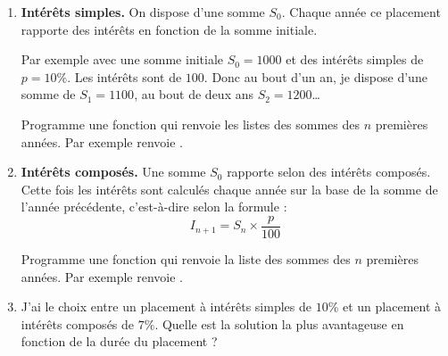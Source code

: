 \documentclass[11pt,class=report,crop=false]{standalone}
\begin{document}
\begin{activite}


\begin{enumerate}
  \item \textbf{Intérêts simples.} On dispose d'une somme $S_0$. Chaque année ce placement rapporte des intérêts en fonction de la somme initiale. 
 
  Par exemple avec une somme initiale $S_0 = 1000$ et des intérêts simples de $p = 10 \%$. Les intérêts sont de $100$. Donc au bout d'un an, je dispose d'une somme de $S_1=1100$, au bout de deux ans $S_2 = 1200$\ldots
  
  Programme une fonction  qui renvoie les listes des sommes des $n$ premières années. Par exemple  renvoie 
  \ci{[1000, 1100, 1200, 1300]}.
  
  
  
  \item \textbf{Intérêts composés.} Une somme $S_0$ rapporte selon des intérêts composés. Cette fois les intérêts sont calculés chaque année sur la base de la somme de l'année précédente, c'est-à-dire selon la formule : 
  $$I_{n+1} = S_n \times \frac {p}{100}$$
  
    Programme une fonction  qui renvoie la liste des sommes des $n$ premières années. Par exemple  renvoie 
  \ci{[1000, 1100, 1210, 1331]}.
  
  
  \item J'ai le choix entre un placement à intérêts simples de $10\%$ et un placement à intérêts composés de $7\%$.  Quelle est la solution la plus avantageuse en fonction de la durée du placement ? 
  
\end{enumerate}

\end{activite}

\end{document}
